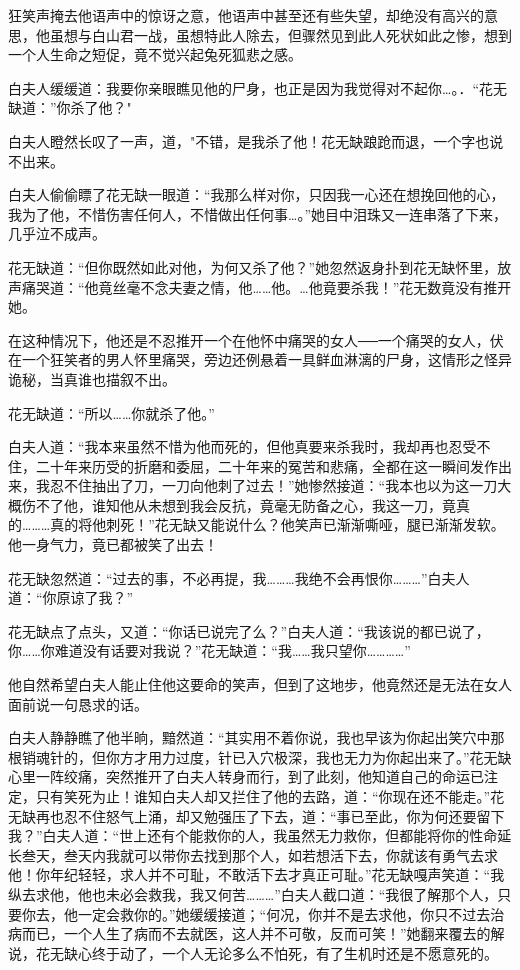 \documentclass[12pt,oneside]{book}
\begin{document}
狂笑声掩去他语声中的惊讶之意，他语声中甚至还有些失望，却绝没有高兴的意思，他虽想与白山君一战，虽想特此人除去，但骤然见到此人死状如此之惨，想到一个人生命之短促，竟不觉兴起兔死狐悲之感。

白夫人缓缓道：我要你亲眼瞧见他的尸身，也正是因为我觉得对不起你\ldots。．``花无缺道：''你杀了他？"

白夫人瞪然长叹了一声，道，"不错，是我杀了他！花无缺踉跄而退，一个字也说不出来。

白夫人偷偷瞟了花无缺一眼道：``我那么样对你，只因我一心还在想挽回他的心，我为了他，不惜伤害任何人，不惜做出任何事\ldots。''她目中泪珠又一连串落了下来，几乎泣不成声。

花无缺道：``但你既然如此对他，为何又杀了他？''她忽然返身扑到花无缺怀里，放声痛哭道：``他竟丝毫不念夫妻之情，他\ldots\ldots 他。\ldots 他竟要杀我！''花无数竟没有推开她。

在这种情况下，他还是不忍推开一个在他怀中痛哭的女人──一个痛哭的女人，伏在一个狂笑者的男人怀里痛哭，旁边还例悬着一具鲜血淋漓的尸身，这情形之怪异诡秘，当真谁也描叙不出。

花无缺道：``所以\ldots\ldots 你就杀了他。''

白夫人道：``我本来虽然不惜为他而死的，但他真要来杀我时，我却再也忍受不住，二十年来历受的折磨和委屈，二十年来的冤苦和悲痛，全都在这一瞬间发作出来，我忍不住抽出了刀，一刀向他刺了过去！''她惨然接道：``我本也以为这一刀大概伤不了他，谁知他从未想到我会反抗，竟毫无防备之心，我这一刀，竟真的\ldots\ldots\ldots 真的将他刺死！''花无缺又能说什么？他笑声已渐渐嘶哑，腿已渐渐发软。他一身气力，竟已都被笑了出去！

花无缺忽然道：``过去的事，不必再提，我\ldots\ldots\ldots 我绝不会再恨你\ldots\ldots\ldots{}''白夫人道：``你原谅了我？''

花无缺点了点头，又道：``你话已说完了么？''白夫人道：``我该说的都已说了，你\ldots\ldots 你难道没有话要对我说？''花无缺道：``我\ldots\ldots 我只望你\ldots\ldots\ldots\ldots{}''

他自然希望白夫人能止住他这要命的笑声，但到了这地步，他竟然还是无法在女人面前说一句恳求的话。

白夫人静静瞧了他半晌，黯然道：``其实用不着你说，我也早该为你起出笑穴中那根销魂针的，但你方才用力过度，针已入穴极深，我也无力为你起出来了。''花无缺心里一阵绞痛，突然推开了白夫人转身而行，到了此刻，他知道自己的命运已注定，只有笑死为止！谁知白夫人却又拦住了他的去路，道：``你现在还不能走。''花无缺再也忍不住怒气上涌，却又勉强压了下去，道：``事已至此，你为何还要留下我？''白夫人道：``世上还有个能救你的人，我虽然无力救你，但都能将你的性命延长叁天，叁天内我就可以带你去找到那个人，如若想活下去，你就该有勇气去求他！你年纪轻轻，求人并不可耻，不敢活下去才真正可耻。''花无缺嘎声笑道：``我纵去求他，他也未必会救我，我又何苦\ldots\ldots\ldots{}''白夫人截口道：``我很了解那个人，只要你去，他一定会救你的。''她缓缓接道；``何况，你并不是去求他，你只不过去治病而已，一个人生了病而不去就医，这人并不可敬，反而可笑！''她翻来覆去的解说，花无缺心终于动了，一个人无论多么不怕死，有了生机时还是不愿意死的。
\end{document}
